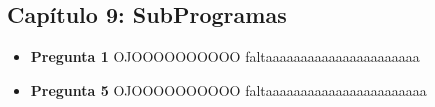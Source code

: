 \documentclass[12pt,oneside]{article}
\begin{document}
		\subsection{Capítulo 9: SubProgramas}      
			\begin{itemize}
				\item {\bf Pregunta 1}
					OJOOOOOOOOOO faltaaaaaaaaaaaaaaaaaaaaaa
				\item {\bf Pregunta 5}
					OJOOOOOOOOOO faltaaaaaaaaaaaaaaaaaaaaaaa
				\end{itemize}


\end{document}
